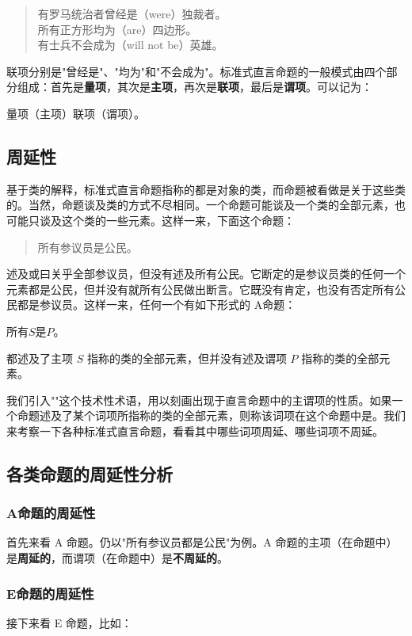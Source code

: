 \begin{quote}
有罗马统治者曾经是（were）独裁者。\\
所有正方形均为（are）四边形。\\
有士兵不会成为（will not be）英雄。
\end{quote}

联项分别是"曾经是"、"均为"和"不会成为"。标准式直言命题的一般模式由四个部分组成：首先是\textbf{量项}，其次是\textbf{主项}，再次是\textbf{联项}，最后是\textbf{谓项}。可以记为：

量项（主项）联项（谓项）。

\subsection{周延性}
基于类的解释，标准式直言命题指称的都是对象的类，而命题被看做是关于这些类的。当然，命题谈及类的方式不尽相同。一个命题可能谈及一个类的全部元素，也可能只谈及这个类的一些元素。这样一来，下面这个命题：

\begin{quote}
所有参议员是公民。
\end{quote}

述及或曰关乎全部参议员，但没有述及所有公民。它断定的是参议员类的任何一个元素都是公民，但并没有就所有公民做出断言。它既没有肯定，也没有否定所有公民都是参议员。这样一来，任何一个有如下形式的 A命题：

所有$S$是$P$。

都述及了主项 $S$ 指称的类的全部元素，但并没有述及谓项 $P$ 指称的类的全部元素。

我们引入""这个技术性术语，用以刻画出现于直言命题中的主谓项的性质。如果一个命题述及了某个词项所指称的类的全部元素，则称该词项在这个命题中是。我们来考察一下各种标准式直言命题，看看其中哪些词项周延、哪些词项不周延。

\subsection{各类命题的周延性分析}

\subsubsection{A命题的周延性}
首先来看 A 命题。仍以"所有参议员都是公民"为例。A 命题的主项（在命题中）是\textbf{周延的}，而谓项（在命题中）是\textbf{不周延的}。

\subsubsection{E命题的周延性}
接下来看 E 命题，比如：

